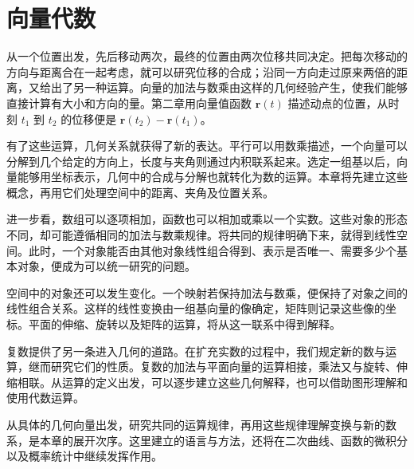 \chapter{向量代数}

从一个位置出发，先后移动两次，最终的位置由两次位移共同决定。把每次移动的方向与距离合在一起考虑，就可以研究位移的合成；沿同一方向走过原来两倍的距离，又给出了另一种运算。向量的加法与数乘由这样的几何经验产生，使我们能够直接计算有大小和方向的量。第二章用向量值函数 \(\mathbf r(t)\) 描述动点的位置，从时刻 \(t_1\) 到 \(t_2\) 的位移便是 \(\mathbf r(t_2)-\mathbf r(t_1)\)。

有了这些运算，几何关系就获得了新的表达。平行可以用数乘描述，一个向量可以分解到几个给定的方向上，长度与夹角则通过内积联系起来。选定一组基以后，向量能够用坐标表示，几何中的合成与分解也就转化为数的运算。本章将先建立这些概念，再用它们处理空间中的距离、夹角及位置关系。

进一步看，数组可以逐项相加，函数也可以相加或乘以一个实数。这些对象的形态不同，却可能遵循相同的加法与数乘规律。将共同的规律明确下来，就得到线性空间。此时，一个对象能否由其他对象线性组合得到、表示是否唯一、需要多少个基本对象，便成为可以统一研究的问题。

空间中的对象还可以发生变化。一个映射若保持加法与数乘，便保持了对象之间的线性组合关系。这样的线性变换由一组基向量的像确定，矩阵则记录这些像的坐标。平面的伸缩、旋转以及矩阵的运算，将从这一联系中得到解释。

复数提供了另一条进入几何的道路。在扩充实数的过程中，我们规定新的数与运算，继而研究它们的性质。复数的加法与平面向量的运算相接，乘法又与旋转、伸缩相联。从运算的定义出发，可以逐步建立这些几何解释，也可以借助图形理解和使用代数运算。

从具体的几何向量出发，研究共同的运算规律，再用这些规律理解变换与新的数系，是本章的展开次序。这里建立的语言与方法，还将在二次曲线、函数的微积分以及概率统计中继续发挥作用。

\newpage








